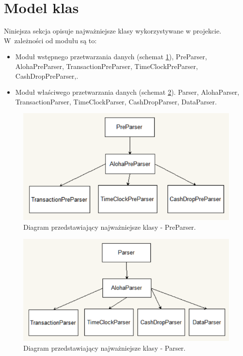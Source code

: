 \documentclass[a4paper]{book}
\begin{document}
\section{Model klas}
Niniejsza sekcja opisuje najważniejsze klasy wykorzystywane w projekcie. W~zależności od modułu są to:
\begin{itemize}
	\item Moduł wstępnego przetwarzania danych (schemat \ref{fig:preparser_diagram_klas}),
	\subitem PreParser,
	\subitem AlohaPreParser,
	\subitem TransactionPreParser,
	\subitem TimeClockPreParser,
	\subitem CashDropPreParser,.
	\item Moduł właściwego przetwarzania danych (schemat \ref{fig:parser_diagram_klas}).
	\subitem Parser,
	\subitem AlohaParser,
	\subitem TransactionParser,
	\subitem TimeClockParser,
	\subitem CashDropParser,
	\subitem DataParser.
\end{itemize}
\begin{figure}[t]
	\centering
	\includegraphics[width=\textwidth]{./img/preparser_diagram_klas.png}
	\caption{Diagram przedstawiający najważniejsze klasy - PreParser.}
	\label{fig:preparser_diagram_klas}
\end{figure}
\begin{figure}[t]
	\centering
	\includegraphics[width=\textwidth]{./img/parser_diagram_klas.png}
	\caption{Diagram przedstawiający najważniejsze klasy - Parser.}
	\label{fig:parser_diagram_klas}
\end{figure}
\end{document}
